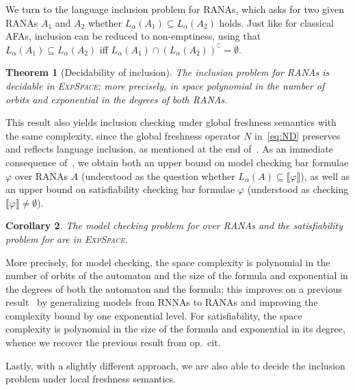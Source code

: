 \documentclass[10pt,a4paper]{amsart}
\newtheorem{theo}{Theorem}[section]
\newtheorem{cor}[theo]{Corollary}
\theoremstyle{definition}
\renewcommand{\textsf}[1]{{\oldtextsf{\small#1}}}
\newcommand{\seq}{\subseteq}
\newcommand{\muBar}{\mbox{\textsf{Bar-$\mu$TL}}\xspace}
\newcommand{\sem}[1]{\llbracket #1 \rrbracket}
\newcommand{\EXPSPACE}{\textsc{ExpSpace}\xspace}
\begin{document}
We turn to the language inclusion problem for RANAs, which asks for two given RANAs $A_1$ and $A_2$ whether $L_\alpha(A_1) \seq L_\alpha(A_2)$ holds. Just like for classical AFAs, inclusion can be reduced to non-emptiness, using that $L_\alpha(A_1) \seq L_\alpha(A_2)$ iff $L_\alpha(A_1)\cap ({L_\alpha(A_2)})^\complement = \emptyset$.

\begin{theo}[Decidability of inclusion] \label{thm:decincl}
  The inclusion problem for RANAs
  is decidable in \EXPSPACE; more precisely, 
  in space polynomial in the number of orbits and exponential in the degrees of both RANAs.
\end{theo}

\noindent %
This result also yields inclusion checking under
global freshness semantics with the same complexity, since the global
freshness operator $N$ in~\eqref{eq:ND} preserves and reflects
language inclusion, as mentioned at the end
of~. As an immediate consequence of~,
we obtain both an upper bound on model checking bar formulae $\varphi$ over  RANAs $A$ (understood as the
question whether $L_\alpha(A) \seq \sem{\varphi}$), as well as an upper bound on satisfiability checking bar formulae
$\varphi$ (understood as checking $\sem{\varphi} \neq \emptyset$).
\begin{cor}
  The model checking problem for \muBar{} over RANAs and the satisfiability problem for \muBar{} are in
  \EXPSPACE.
\end{cor}
\noindent
More precisely, for model checking, the space complexity is polynomial in the number of orbits of
the automaton and the size of the formula and exponential in the degrees of both the automaton
and the formula; this improves on a previous result~\cite[Thm.~7.2]{hms21} by generalizing models
from RNNAs to RANAs and improving the complexity bound by one exponential
level. For satisfiability, the space complexity is polynomial in the size of the formula and
exponential in its degree, whence we recover the previous result from op.~cit.

Lastly, with a slightly different approach, we are
also able to decide the inclusion problem under local freshness
semantics.
\end{document}
